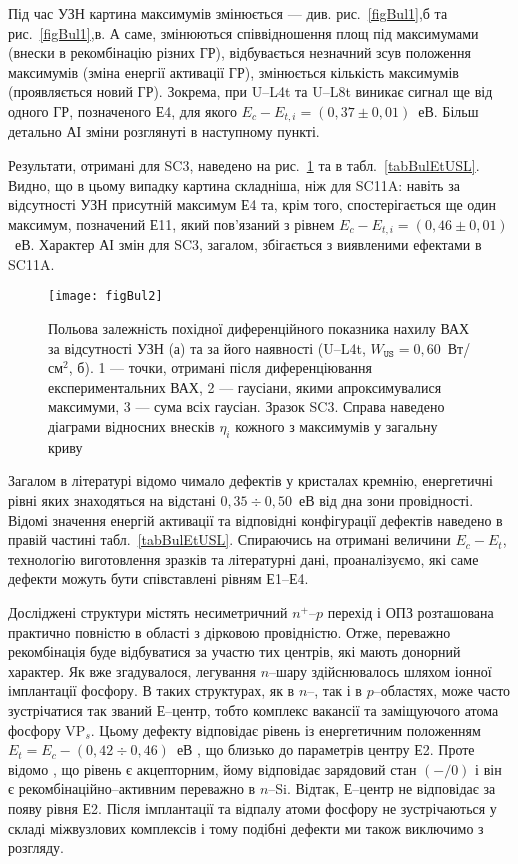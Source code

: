 Під час УЗН картина максимумів змінюється --- див. рис.~\ref{figBul1},б та рис.~\ref{figBul1},в.
А саме, змінюються співвідношення площ під максимумами (внески в рекомбінацію різних ГР),
відбувається незначний зсув положення максимумів (зміна енергії активації ГР),
змінюється кількість максимумів (проявляється новий ГР).
Зокрема, при U--L4t та U--L8t виникає сигнал ще від одного ГР,
позначеного Е4, для якого $E_c-E_{t,i}=(0,37\pm0,01)$~еВ.
Більш детально АІ зміни розглянуті в наступному пункті.


Результати, отримані для SC3, наведено на рис.~\ref{figBul2} та в табл.~\ref{tabBulEtUSL}.
Видно, що в цьому випадку картина складніша, ніж для SC11A:
навіть за відсутності УЗН присутній максимум Е4 та, крім того,
спостерігається ще один максимум, позначений Е11, який пов'язаний з рівнем $E_c-E_{t,i}=(0,46\pm0,01)$~еВ.
Характер АІ змін для SC3, загалом, збігається з виявленими ефектами в SC11A.




\begin{figure}
\center
\texttt{[image: figBul2]}
\caption{\label{figBul2}
Польова залежність похідної диференційного показника нахилу ВАХ за відсутності УЗН (а)
та за його наявності (U--L4t,  $W_\mathtt{US}=0,60$~Вт/см$^2$, б).
1 --- точки, отримані після диференціювання експериментальних ВАХ,
2 --- гаусіани, якими апроксимувалися максимуми,
3 --- сума всіх гаусіан.
Зразок SC3.
Справа наведено діаграми відносних внесків $\eta_i$ кожного з максимумів у загальну криву
}%
\end{figure}

Загалом в літературі відомо чимало дефектів у кристалах кремнію, енергетичні рівні яких знаходяться на відстані
$0,35\div0,50$~еВ від дна зони провідності.
Відомі значення енергій активації та відповідні конфігурації дефектів наведено в правій частині табл.~\ref{tabBulEtUSL}.
Спираючись на отримані величини $E_c-E_t$, технологію виготовлення зразків та літературні дані,
проаналізуємо, які саме дефекти можуть бути співставлені рівням Е1--Е4.

Досліджені структури містять несиметричний $n^+$--$p$ перехід і ОПЗ розташована практично повністю в області з дірковою провідністю.
Отже, переважно рекомбінація буде відбуватися за участю тих центрів, які мають донорний характер.
Як вже згадувалося, легування $n$--шару здійснювалось шляхом іонної імплантації фосфору.
В таких структурах, як в $n$--, так і в $p$--областях, може часто зустрічатися так званий Е--центр,
тобто комплекс вакансії та заміщуючого атома фосфору VP$_s$.
Цьому дефекту відповідає  рівень із енергетичним положенням $E_t=E_c-(0,42\div0,46)$~еВ \cite{VI:Luc,Karazh,Kuchinskii,Ecentre:2005}, що близько до параметрів центру Е2.
Проте відомо \cite{Kuchinskii,Ecentre:2005}, що рівень є акцепторним, йому відповідає зарядовий стан  $(-/0)$ і він є рекомбінаційно--активним переважно в $n$--Si.
Відтак, Е--центр не відповідає за появу рівня Е2.
Після імплантації та відпалу атоми фосфору не зустрічаються у складі міжвузлових комплексів \cite{ChelyadFTT} і тому подібні дефекти ми також виключимо з розгляду.

